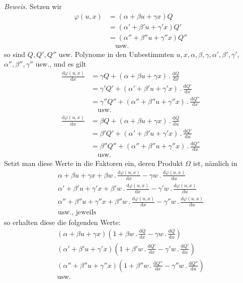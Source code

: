 \textit{Beweis.} Setzen wir
\[
\begin{aligned}
\varphi(u,x)&=(\alpha+\beta u+\gamma x)Q\\
&=(\alpha'+\beta'u+\gamma'x)Q'\\
&=(\alpha''+\beta''u+\gamma''x)Q''\\
&\quad\text{usw.}
\end{aligned}
\]
so sind $Q,Q',Q''$ usw. Polynome in den Unbestimmten $u,\allowbreak x,\allowbreak \alpha,\allowbreak \beta,\allowbreak \gamma,\allowbreak \alpha',\allowbreak \beta',\allowbreak \gamma'$, $\alpha'',\beta'',\gamma''$ usw., und es gilt
\[
\begin{aligned}
\frac{\mathrm d\varphi(u,x)}{\mathrm dx}&=\gamma Q+(\alpha+\beta u+\gamma x)\, .\,\frac{\mathrm dQ}{\mathrm dx}\\
&=\gamma'Q'+(\alpha'+\beta'u+\gamma'x)\, .\,\frac{\mathrm dQ'}{\mathrm dx}\\
&=\gamma''Q''+(\alpha''+\beta''u+\gamma''x)\, .\,\frac{\mathrm dQ''}{\mathrm dx}\\
&\quad\text{usw.}
\end{aligned}
\]
\[
\begin{aligned}
\frac{\mathrm d\varphi(u,x)}{\mathrm du}&=\beta Q+(\alpha+\beta u+\gamma x)\, .\,\frac{\mathrm dQ}{\mathrm du}\\
&=\beta'Q'+(\alpha'+\beta'u+\gamma'x)\, .\,\frac{\mathrm dQ'}{\mathrm du}\\
&=\beta''Q''+(\alpha''+\beta''u+\gamma''x)\, .\,\frac{\mathrm dQ''}{\mathrm du}\\
&\quad\text{usw.}
\end{aligned}
\]
Setzt man diese Werte in die Faktoren ein, deren Produkt $\Omega$ ist, nämlich in
\[
\begin{gathered}
\alpha+\beta u+\gamma x+\beta w\, .\,\frac{\mathrm d\varphi(u,x)}{\mathrm dx}-\gamma w\, .\,\frac{\mathrm d\varphi(u,x)}{\mathrm du}\\
\alpha'+\beta'u+\gamma'x+\beta'w\, .\,\frac{\mathrm d\varphi(u,x)}{\mathrm dx}-\gamma'w\, .\,\frac{\mathrm d\varphi(u,x)}{\mathrm du}\\
\alpha''+\beta''u+\gamma''x+\beta''w\, .\,\frac{\mathrm d\varphi(u,x)}{\mathrm dx}-\gamma''w\, .\,\frac{\mathrm d\varphi(u,x)}{\mathrm du}\\
\text{usw., jeweils}
\end{gathered}
\]
so erhalten diese die folgenden Werte:
\[
\begin{gathered}
(\alpha+\beta u+\gamma x)(1+\beta w\, .\,\tfrac{\mathrm dQ}{\mathrm dx}-\gamma w\, .\,\tfrac{\mathrm dQ}{\mathrm du})\\
(\alpha'+\beta'u+\gamma'x)(1+\beta'w\, .\,\tfrac{\mathrm dQ'}{\mathrm dx}-\gamma'w\, .\,\tfrac{\mathrm dQ'}{\mathrm du})\\
(\alpha''+\beta''u+\gamma''x)(1+\beta''w\, .\,\tfrac{\mathrm dQ''}{\mathrm dx}-\gamma''w\, .\,\tfrac{\mathrm dQ''}{\mathrm du})\\
\text{usw.}
\end{gathered}
\]

